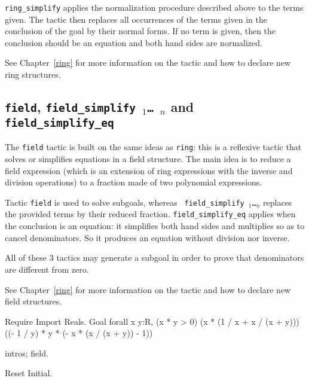 \begin{coq_example*}
{\tt ring\_simplify} applies the normalization procedure described
above to the terms given. The tactic then replaces all occurrences of
the terms given in the conclusion of the goal by their normal
forms. If no term is given, then the conclusion should be an equation
and both hand sides are normalized.

See Chapter~\ref{ring} for more information on the tactic and how to
declare new ring structures.

\subsection{{\tt field}, {\tt field\_simplify \term$_1$\dots\ \term$_n$}
            and {\tt field\_simplify\_eq}
}

The {\tt field} tactic is built on the same ideas as {\tt ring}: this
is a reflexive tactic that solves or simplifies equations in a field
structure. The main idea is to reduce a field expression (which is an
extension of ring expressions with the inverse and division
operations) to a fraction made of two polynomial expressions.

Tactic {\tt field} is used to solve subgoals, whereas {\tt
  field\_simplify \term$_1$\dots\term$_n$} replaces the provided terms
by their reduced fraction. {\tt field\_simplify\_eq} applies when the
conclusion is an equation: it simplifies both hand sides and multiplies
so as to cancel denominators. So it produces an equation without
division nor inverse.

All of these 3 tactics may generate a subgoal in order to prove that
denominators are different from zero.

See Chapter~\ref{ring} for more information on the tactic and how to
declare new field structures.

\Example
\begin{coq_example*}
Require Import Reals.
Goal forall x y:R,
    (x * y > 0)%
    (x * (1 / x + x / (x + y)))%
    ((- 1 / y) * y * (- x * (x / (x + y)) - 1))%
\end{coq_example*}

\begin{coq_example}
intros; field.
\end{coq_example}

\begin{coq_eval}
Reset Initial.
\end{coq_eval}


\end{coq_example*}
